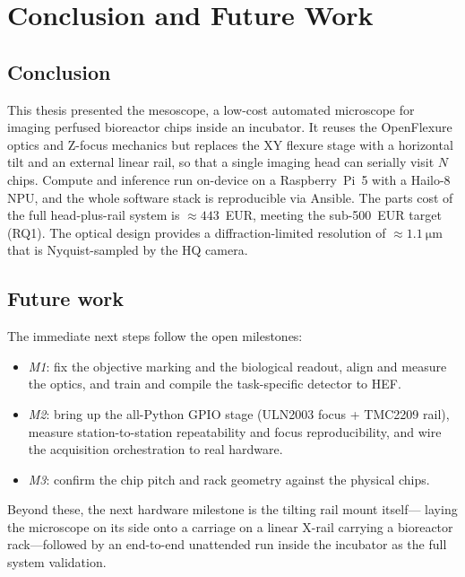 \section{Conclusion and Future Work}
\label{sec:conclusion}

\subsection{Conclusion}
This thesis presented the mesoscope, a low-cost automated microscope for
imaging perfused bioreactor chips inside an incubator. It reuses the OpenFlexure
optics and Z-focus mechanics but replaces the XY flexure stage with a horizontal
tilt and an external linear rail, so that a single imaging head can serially
visit $N$ chips. Compute and inference run on-device on a Raspberry~Pi~5 with a
Hailo-8 NPU, and the whole software stack is reproducible via Ansible. The parts
cost of the full head-plus-rail system is $\approx\num{443}$~EUR, meeting the
sub-\num{500}~EUR target (RQ1). The optical design provides a
diffraction-limited resolution of $\approx\SI{1.1}{\micro\meter}$ that is
Nyquist-sampled by the HQ camera.

\subsection{Future work}
The immediate next steps follow the open milestones:
\begin{itemize}
\item \emph{M1}: fix the objective marking and the biological readout, align and
  measure the optics, and train and compile the task-specific detector to HEF.
\item \emph{M2}: bring up the all-Python GPIO stage (ULN2003 focus + TMC2209
  rail), measure station-to-station repeatability and focus reproducibility, and
  wire the acquisition orchestration to real hardware.
\item \emph{M3}: confirm the chip pitch and rack geometry against the physical
  chips.
\end{itemize}
Beyond these, the next hardware milestone is the tilting rail mount itself---
laying the microscope on its side onto a carriage on a linear X-rail carrying a
bioreactor rack---followed by an end-to-end unattended run inside the incubator
as the full system validation.
